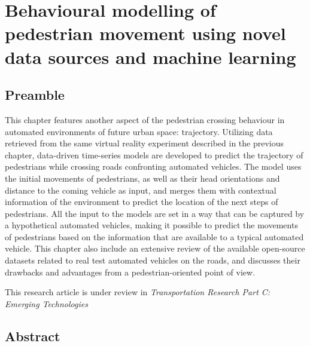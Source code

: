 \chapter{Behavioural modelling of pedestrian movement using novel data sources and machine learning}
\label{chap6}
\thispagestyle{empty}
\pagebreak

\section*{Preamble}
This chapter features another aspect of the pedestrian crossing behaviour in automated environments of future urban space: trajectory. Utilizing data retrieved from the same virtual reality experiment described in the previous chapter, data-driven time-series models are developed to predict the trajectory of pedestrians while crossing roads confronting automated vehicles. The model uses the initial movements of pedestrians, as well as their head orientations and distance to the coming vehicle as input, and merges them with contextual information of the environment to predict the location of the next steps of pedestrians. All the input to the models are set in a way that can be captured by a hypothetical automated vehicles, making it possible to predict the movements of pedestrians based on the information that are available to a typical automated vehicle. This chapter also include an extensive review of the available open-source datasets related to real test automated vehicles on the roads, and discusses their drawbacks and advantages from a pedestrian-oriented point of view.

\vspace{1em}
\noindent
This research article is under review in \textit{Transportation Research Part C: Emerging Technologies}
\clearpage

\section*{Abstract}

\clearpage












